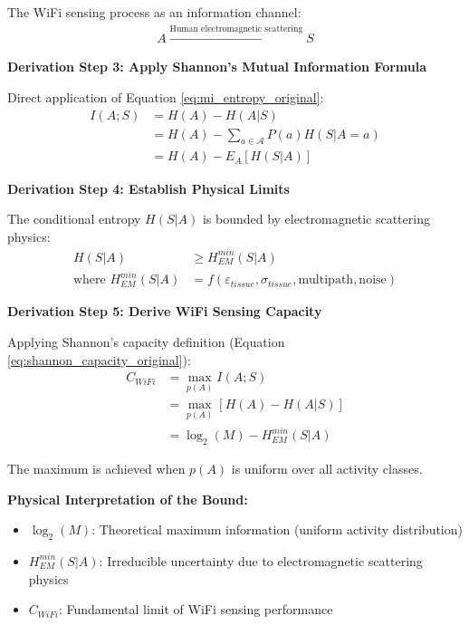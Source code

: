 \documentclass[12pt,a4paper]{article}
\begin{document}
The WiFi sensing process as an information channel:
\begin{align}
A \xrightarrow{\text{Human electromagnetic scattering}} S \label{eq:wifi_sensing_channel}
\end{align}

\textbf{Derivation Step 3: Apply Shannon's Mutual Information Formula}

Direct application of Equation \ref{eq:mi_entropy_original}:
\begin{align}
I(A;S) &= H(A) - H(A|S) \label{eq:wifi_mi_basic}\\
&= H(A) - \sum_{a \in \mathcal{A}} P(a)H(S|A=a) \label{eq:wifi_mi_expanded}\\
&= H(A) - E_A[H(S|A)] \label{eq:wifi_mi_expectation}
\end{align}

\textbf{Derivation Step 4: Establish Physical Limits}

The conditional entropy $H(S|A)$ is bounded by electromagnetic scattering physics:
\begin{align}
H(S|A) &\geq H_{EM}^{min}(S|A) \label{eq:em_entropy_bound}\\
\text{where } H_{EM}^{min}(S|A) &= f(\varepsilon_{tissue}, \sigma_{tissue}, \text{multipath}, \text{noise}) \label{eq:em_entropy_factors}
\end{align}

\textbf{Derivation Step 5: Derive WiFi Sensing Capacity}

Applying Shannon's capacity definition (Equation \ref{eq:shannon_capacity_original}):
\begin{align}
C_{WiFi} &= \max_{p(A)} I(A;S) \label{eq:wifi_capacity_definition}\\
&= \max_{p(A)} [H(A) - H(A|S)] \label{eq:wifi_capacity_expanded}\\
&= \log_2(M) - H_{EM}^{min}(S|A) \label{eq:wifi_capacity_final}
\end{align}

The maximum is achieved when $p(A)$ is uniform over all activity classes.

\textbf{Physical Interpretation of the Bound:}
\begin{itemize}
\item $\log_2(M)$: Theoretical maximum information (uniform activity distribution)
\item $H_{EM}^{min}(S|A)$: Irreducible uncertainty due to electromagnetic scattering physics
\item $C_{WiFi}$: Fundamental limit of WiFi sensing performance
\end{itemize}
\end{document}
